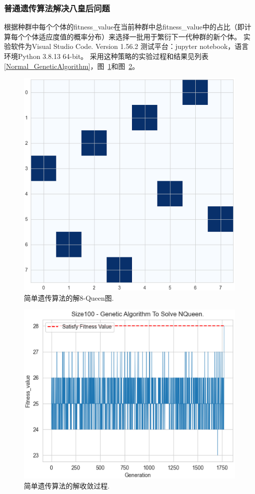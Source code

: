 \documentclass[12pt,a4paper,UTF8]{ctexart}
\begin{document}
\subsubsection{普通遗传算法解决八皇后问题}
根据种群中每个个体的fitness\_value在当前种群中总fitness\_value中的占比（即计算每个个体适应度值的概率分布）来选择一批用于繁衍下一代种群的新个体。
实验软件为Visual Studio Code. Version 1.56.2 测试平台：jupyter notebook，语言环境Python 3.8.13 64-bit。
采用这种策略的实验过程和结果见列表\ref{Normal_GeneticAlgorithm}，图~\ref{fig:简单遗传算法的解8-Queen图}和图~\ref{fig:简单遗传算法的解收敛过程}。

\begin{figure}[htbp]
    \centering
    \includegraphics[width=12cm]{allpicture/queen100normal.eps}
    \caption{简单遗传算法的解8-Queen图.}
    \label{fig:简单遗传算法的解8-Queen图}
\end{figure}
\begin{figure}[htbp]
    \centering
    \includegraphics[width=12cm]{allpicture/generic100normal.eps}
    \caption{简单遗传算法的解收敛过程.}
    \label{fig:简单遗传算法的解收敛过程}
\end{figure}













\end{document}
